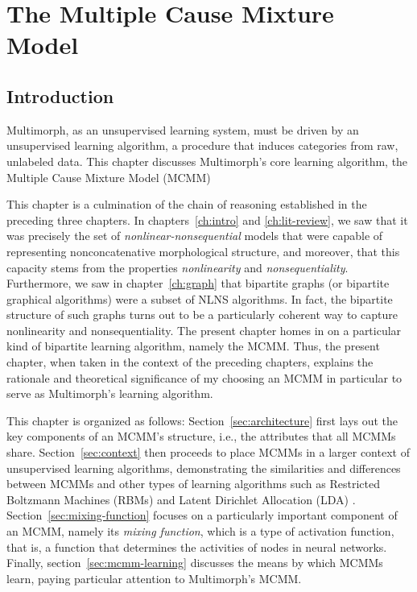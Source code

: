 \chapter{The Multiple Cause Mixture Model}
\label{ch:MCMM}

\section{Introduction}
\label{sec:mcmm:intro}
Multimorph, as an unsupervised learning system, must be
driven by an unsupervised learning algorithm, a procedure that induces categories from raw, unlabeled data.
This chapter discusses Multimorph's core learning algorithm, the Multiple Cause Mixture Model (MCMM) \citep{saund:94} 

This chapter is a culmination of the chain of reasoning established in the preceding three chapters.
In chapters~\ref{ch:intro} and \ref{ch:lit-review}, we saw that it was precisely 
the set of \emph{nonlinear-nonsequential} models that were capable of representing 
nonconcatenative morphological structure, and moreover, that this capacity stems from the properties \emph{nonlinearity}
and \emph{nonsequentiality}. Furthermore, we saw in 
chapter~\ref{ch:graph} that bipartite graphs (or bipartite graphical algorithms) were a 
subset of NLNS algorithms. In fact, the bipartite structure of such graphs turns out to 
be a particularly coherent way to capture nonlinearity and nonsequentiality.
The present chapter homes in on a particular kind of bipartite learning algorithm, namely 
the MCMM. Thus, the present chapter, when taken in the context of the preceding chapters, 
explains the rationale and theoretical significance of my choosing an MCMM 
in particular to serve as Multimorph's learning algorithm.

This chapter is organized as follows: Section~\ref{sec:architecture} first lays out the key components 
of an MCMM's structure, i.e., the attributes that all MCMMs share. 
Section~\ref{sec:context} then proceeds to place MCMMs in a larger context of 
unsupervised learning algorithms, demonstrating 
the similarities and differences between MCMMs and other types of
 learning algorithms such as Restricted Boltzmann Machines (RBMs) \citep{smolensky:1986, hinton:2002, hinton-and-salak:2006}
 and Latent Dirichlet Allocation (LDA) \citep{blei-et-al:2003}. Section~\ref{sec:mixing-function} 
 focuses on a particularly important component of an MCMM, namely its 
 \emph{mixing function}, which is a type of activation function, that is, a 
 function that determines the activities of nodes in neural networks.  
Finally, section~\ref{sec:mcmm-learning} discusses the means by which 
MCMMs learn, paying particular attention to Multimorph's MCMM.

